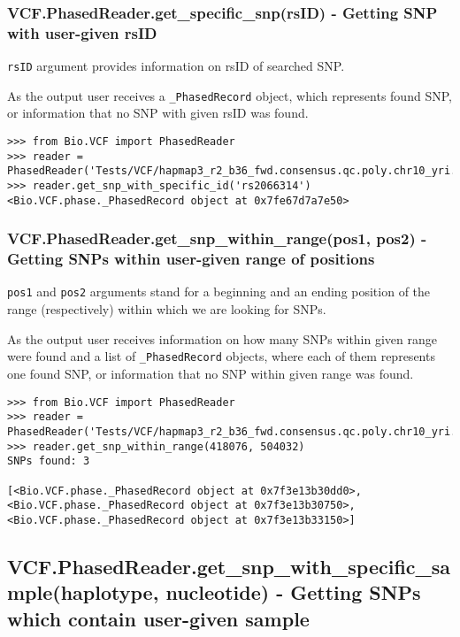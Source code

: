 \subsubsection{VCF.PhasedReader.get\_specific\_snp(rsID) - Getting SNP with user-given rsID}

\noindent \verb|rsID| argument provides information on rsID of searched SNP.

\noindent As the output user receives a \verb|_PhasedRecord| object, which represents found SNP, or information that no SNP with given rsID was found.


\begin{verbatim}
>>> from Bio.VCF import PhasedReader
>>> reader = PhasedReader('Tests/VCF/hapmap3_r2_b36_fwd.consensus.qc.poly.chr10_yri.D.phased')
>>> reader.get_snp_with_specific_id('rs2066314')
<Bio.VCF.phase._PhasedRecord object at 0x7fe67d7a7e50>

\end{verbatim}

\subsubsection{VCF.PhasedReader.get\_snp\_within\_range(pos1, pos2) - Getting SNPs within user-given range of positions}

\noindent \verb|pos1| and \verb|pos2| arguments stand for a beginning and an ending position of the range (respectively) within which we are looking for SNPs.

\noindent As the output user receives information on how many SNPs within given range were found and a list of \verb|_PhasedRecord| objects, where each of them represents
one found SNP, or information that no SNP within given range was found.

\begin{verbatim}
>>> from Bio.VCF import PhasedReader
>>> reader = PhasedReader('Tests/VCF/hapmap3_r2_b36_fwd.consensus.qc.poly.chr10_yri.D.phased')
>>> reader.get_snp_within_range(418076, 504032)
SNPs found: 3

[<Bio.VCF.phase._PhasedRecord object at 0x7f3e13b30dd0>,
<Bio.VCF.phase._PhasedRecord object at 0x7f3e13b30750>,
<Bio.VCF.phase._PhasedRecord object at 0x7f3e13b33150>]

\end{verbatim}

\subsection{VCF.PhasedReader.get\_snp\_with\_specific\_sample(haplotype, nucleotide) - Getting SNPs which contain user-given sample}

